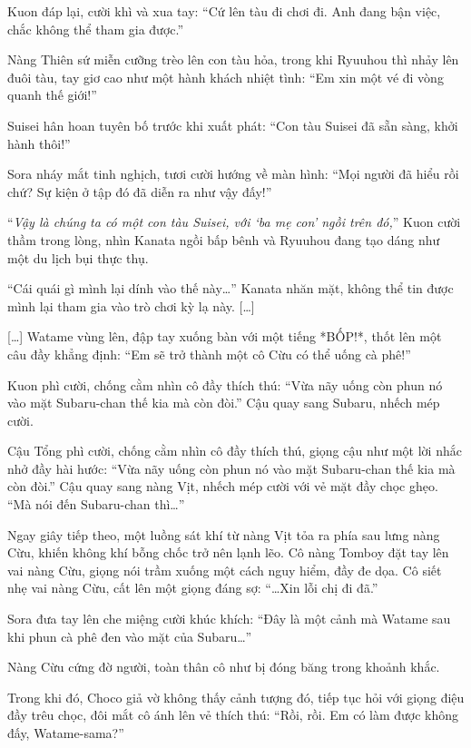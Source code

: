\documentclass[../main.tex]{subfiles}
\begin{document}
Kuon đáp lại, cười khì và xua tay: ``Cứ lên tàu đi chơi đi. Anh đang bận việc, chắc không thể tham gia được.''

Nàng Thiên sứ miễn cưỡng trèo lên con tàu hỏa, trong khi Ryuuhou thì nhảy lên đuôi tàu, tay giơ cao như một hành khách nhiệt tình: ``Em xin một vé đi vòng quanh thế giới!''

Suisei hân hoan tuyên bố trước khi xuất phát: ``Con tàu Suisei đã sẵn sàng, khởi hành thôi!''

Sora nháy mắt tinh nghịch, tươi cười hướng về màn hình: ``Mọi người đã hiểu rồi chứ? Sự kiện ở tập đó đã diễn ra như vậy đấy!''

``\textit{Vậy là chúng ta có một con tàu Suisei, với `ba mẹ con' ngồi trên đó,}'' Kuon cười thầm trong lòng, nhìn Kanata ngồi bấp bênh và Ryuuhou đang tạo dáng như một du lịch bụi thực thụ.

``Cái quái gì mình lại dính vào thế này\dots'' Kanata nhăn mặt, không thể tin được mình lại tham gia vào trò chơi kỳ lạ này. [\dots]


[\dots] Watame vùng lên, đập tay xuống bàn với một tiếng *BỐP!*, thốt lên một câu đầy khẳng định: ``Em sẽ trở thành một cô Cừu có thể uống cà phê!''

Kuon phì cười, chống cằm nhìn cô đầy thích thú: ``Vừa nãy uống còn phun nó vào mặt Subaru-chan thế kia mà còn đòi.'' Cậu quay sang Subaru, nhếch mép cười.

Cậu Tổng phì cười, chống cằm nhìn cô đầy thích thú, giọng cậu như một lời nhắc nhở đầy hài hước: ``Vừa nãy uống còn phun nó vào mặt Subaru-chan thế kia mà còn đòi.'' Cậu quay sang nàng Vịt, nhếch mép cười với vẻ mặt đầy chọc ghẹo. ``Mà nói đến Subaru-chan thì\dots''

Ngay giây tiếp theo, một luồng sát khí từ nàng Vịt tỏa ra phía sau lưng nàng Cừu, khiến không khí bỗng chốc trở nên lạnh lẽo. Cô nàng Tomboy đặt tay lên vai nàng Cừu, giọng nói trầm xuống một cách nguy hiểm, đầy đe dọa. Cô siết nhẹ vai nàng Cừu, cất lên một giọng đáng sợ: ``\dots Xin lỗi chị đi đã.''

Sora đưa tay lên che miệng cười khúc khích: ``Đây là một cảnh mà Watame sau khi phun cà phê đen vào mặt của Subaru\dots''

Nàng Cừu cứng đờ người, toàn thân cô như bị đóng băng trong khoảnh khắc.

Trong khi đó, Choco giả vờ không thấy cảnh tượng đó, tiếp tục hỏi với giọng điệu đầy trêu chọc, đôi mắt cô ánh lên vẻ thích thú: ``Rồi, rồi. Em có làm được không đấy, Watame-sama?''
\end{document}

